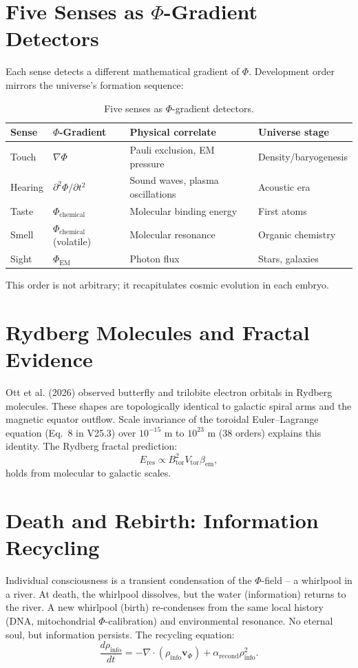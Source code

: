 \documentclass[11pt]{article}
\newcommand{\bem}{\beta_{\mathrm{em}}}
\begin{document}
\section{Five Senses as $\Phi$-Gradient Detectors}
\label{sec:senses}
Each sense detects a different mathematical gradient of $\Phi$. Development order mirrors the universe’s formation sequence:
\begin{table}[ht]
\centering
\caption{Five senses as $\Phi$-gradient detectors.}
\label{tab:senses}
\begin{tabular}{llll}
\toprule
Sense & $\Phi$-Gradient & Physical correlate & Universe stage \\
\midrule
Touch & $\nabla\Phi$ & Pauli exclusion, EM pressure & Density/baryogenesis \\
Hearing & $\partial^2\Phi/\partial t^2$ & Sound waves, plasma oscillations & Acoustic era \\
Taste & $\Phi_{\mathrm{chemical}}$ & Molecular binding energy & First atoms \\
Smell & $\Phi_{\mathrm{chemical}}$ (volatile) & Molecular resonance & Organic chemistry \\
Sight & $\Phi_{\mathrm{EM}}$ & Photon flux & Stars, galaxies \\
\bottomrule
\end{tabular}
\end{table}
This order is not arbitrary; it recapitulates cosmic evolution in each embryo.

\section{Rydberg Molecules and Fractal Evidence}
\label{sec:rydberg}
Ott et al. (2026) observed butterfly and trilobite electron orbitals in Rydberg molecules. These shapes are topologically identical to galactic spiral arms and the magnetic equator outflow. Scale invariance of the toroidal Euler–Lagrange equation (Eq.~8 in V25.3) over $10^{-15}$ m to $10^{23}$ m (38 orders) explains this identity. The Rydberg fractal prediction:
\begin{equation}
E_{\mathrm{res}} \propto B_{\mathrm{tor}}^{2} V_{\mathrm{tor}} \bem,
\label{eq:rydberg_energy}
\end{equation}
holds from molecular to galactic scales.

\section{Death and Rebirth: Information Recycling}
\label{sec:death}
Individual consciousness is a transient condensation of the $\Phi$-field – a whirlpool in a river. At death, the whirlpool dissolves, but the water (information) returns to the river. A new whirlpool (birth) re‑condenses from the same local history (DNA, mitochondrial $\Phi$-calibration) and environmental resonance. No eternal soul, but information persists. The recycling equation:
\begin{equation}
\frac{d\rho_{\mathrm{info}}}{dt} = -\nabla \cdot (\rho_{\mathrm{info}} \mathbf{v}_{\Phi}) + \alpha_{\mathrm{recond}} \rho_{\mathrm{info}}^2.
\label{eq:info_recycle}
\end{equation}
\end{document}
